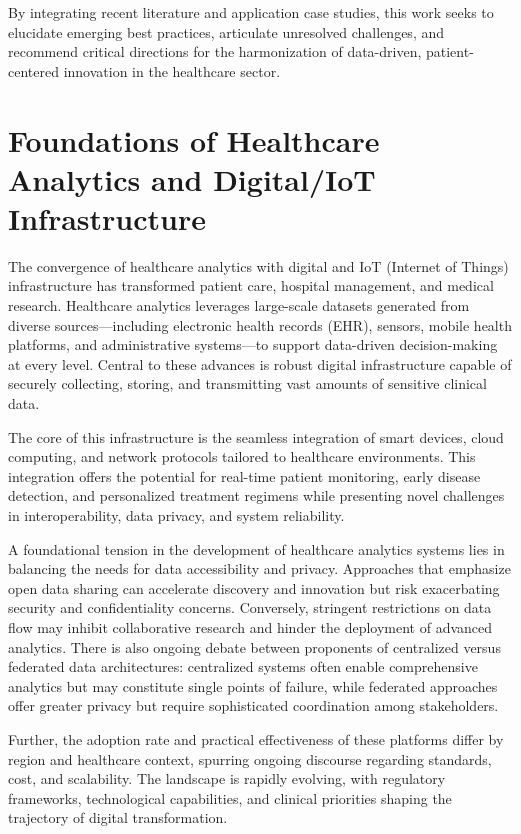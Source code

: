 \documentclass[sigconf]{acmart}
\begin{document}
By integrating recent literature and application case studies, this work seeks to elucidate emerging best practices, articulate unresolved challenges, and recommend critical directions for the harmonization of data-driven, patient-centered innovation in the healthcare sector.

\section{Foundations of Healthcare Analytics and Digital/IoT Infrastructure}

The convergence of healthcare analytics with digital and IoT (Internet of Things) infrastructure has transformed patient care, hospital management, and medical research. Healthcare analytics leverages large-scale datasets generated from diverse sources—including electronic health records (EHR), sensors, mobile health platforms, and administrative systems—to support data-driven decision-making at every level. Central to these advances is robust digital infrastructure capable of securely collecting, storing, and transmitting vast amounts of sensitive clinical data.

The core of this infrastructure is the seamless integration of smart devices, cloud computing, and network protocols tailored to healthcare environments. This integration offers the potential for real-time patient monitoring, early disease detection, and personalized treatment regimens while presenting novel challenges in interoperability, data privacy, and system reliability.

A foundational tension in the development of healthcare analytics systems lies in balancing the needs for data accessibility and privacy. Approaches that emphasize open data sharing can accelerate discovery and innovation but risk exacerbating security and confidentiality concerns. Conversely, stringent restrictions on data flow may inhibit collaborative research and hinder the deployment of advanced analytics. There is also ongoing debate between proponents of centralized versus federated data architectures: centralized systems often enable comprehensive analytics but may constitute single points of failure, while federated approaches offer greater privacy but require sophisticated coordination among stakeholders.

Further, the adoption rate and practical effectiveness of these platforms differ by region and healthcare context, spurring ongoing discourse regarding standards, cost, and scalability. The landscape is rapidly evolving, with regulatory frameworks, technological capabilities, and clinical priorities shaping the trajectory of digital transformation.
\end{document}
